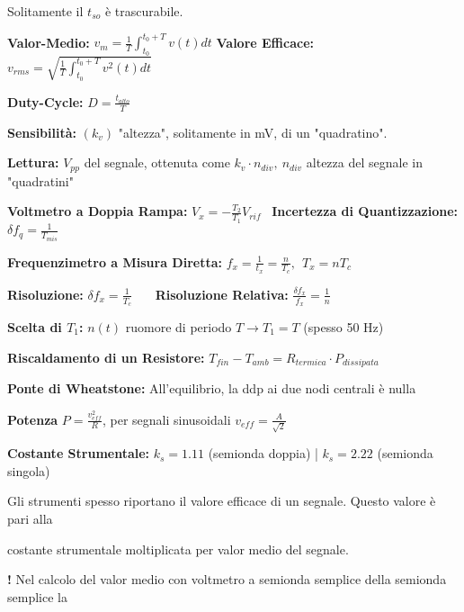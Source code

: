 \documentclass[12pt]{extarticle}
\begin{document}
Solitamente il $t_{so}$ è trascurabile.

{\bf Valor-Medio:} $\displaystyle v_m = \frac{1}{T} \int_{t_0}^{t_0+T} v(t)dt $ {\bf Valore Efficace:} $\displaystyle v_{rms}= \sqrt{\frac{1}{T} \int_{t_0}^{t_0+T} v^2(t)dt}$

{\bf Duty-Cycle:} $\displaystyle D = \frac{t_{alto}}{T}$ 

{\bf Sensibilità:} $\displaystyle (k_v)$ "altezza", solitamente in mV, di un "quadratino".

{\bf Lettura:} $\displaystyle V_{pp} $ del segnale, ottenuta come $\displaystyle k_v\cdot n_{div}, \ n_{div}$ altezza del segnale in "quadratini"

{\bf Voltmetro a Doppia Rampa:} $\displaystyle V_x = -\frac{T_2}{T_1}V_{rif}$ \ {\bf Incertezza di Quantizzazione:} $\delta f_q = \frac{1}{T_{mis}}$


{\bf Frequenzimetro a Misura Diretta:} $\displaystyle f_x = \frac{1}{t_x} = \frac{n}{T_c}, \ \ T_x = nT_c$

{\bf Risoluzione:} $\displaystyle \delta f_x = \frac{1}{T_c}$ \ \ \ {\bf Risoluzione Relativa:} $\displaystyle \frac{\delta f_x}{f_x} = \frac{1}{n}$

{\bf Scelta di $T_1$:} $n(t)$ ruomore di periodo $T \to T_1 = T$ (spesso 50 Hz)

{\bf Riscaldamento di un Resistore:} $\displaystyle T_{fin} - T_{amb} = R_{termica}\cdot P_{dissipata}$

{\bf Ponte di Wheatstone:} All'equilibrio, la ddp ai due nodi centrali è nulla 

{\bf Potenza} $\displaystyle P = \frac{v_{eff}^2}{R} $, per segnali sinusoidali $\displaystyle v_{eff} = \frac{A}{\sqrt{2}}$



{\bf Costante Strumentale:} $\displaystyle k_s = 1.11 $ (semionda doppia) | $\displaystyle k_s = 2.22 $ (semionda singola)

Gli strumenti spesso riportano il valore efficace di un segnale. Questo valore è pari alla

costante strumentale moltiplicata per valor medio del segnale. 

{\bf !} Nel calcolo del valor medio con voltmetro a semionda semplice della semionda semplice la 
\end{document}

